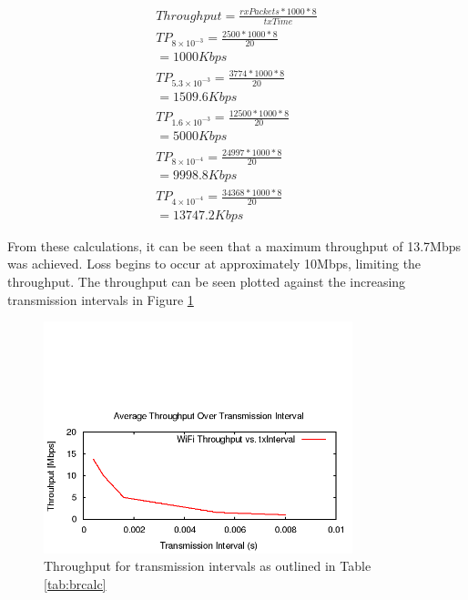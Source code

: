 \begin{gather*}
	Throughput=\frac{rxPackets*1000*8}{txTime} \\
	TP_{8\times10^{-3}}=\frac{2500*1000*8}{20} \\
	= 1000Kbps \\
	TP_{5.3\times10^{-3}}=\frac{3774*1000*8}{20} \\
	= 1509.6Kbps \\
	TP_{1.6\times10^{-3}}=\frac{12500*1000*8}{20} \\
	= 5000Kbps \\
	TP_{8\times10^{-4}}=\frac{24997*1000*8}{20} \\
	= 9998.8Kbps \\
	TP_{4\times10^{-4}}=\frac{34368*1000*8}{20} \\
	= 13747.2Kbps
\end{gather*}

\par From these calculations, it can be seen that a maximum throughput of
13.7Mbps was achieved. Loss begins to occur at approximately 10Mbps, limiting
the throughput. The throughput can be seen plotted against the increasing
transmission intervals in Figure \ref{fig:QAP2Throughput}

\begin{figure}[H]
	\centering
	\includegraphics[width=0.8\textwidth]{images/EE500/QA/P2/Images/wifi-throughput}
	\caption{Throughput for transmission intervals as outlined in
	Table \ref{tab:brcalc}}
	\label{fig:QAP2Throughput}
\end{figure}

